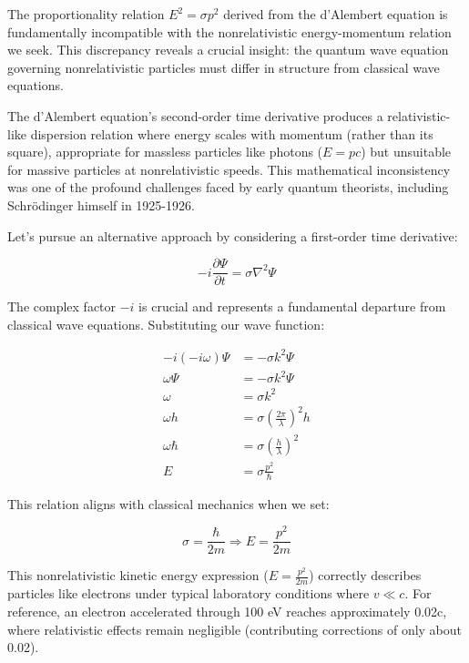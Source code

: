 \documentclass[italian]{HKNdocument}
\begin{document}
The proportionality relation $E^2 = \sigma p^2$ derived from the d'Alembert equation is fundamentally incompatible with the nonrelativistic energy-momentum relation we seek. This discrepancy reveals a crucial insight: the quantum wave equation governing nonrelativistic particles must differ in structure from classical wave equations.

The d'Alembert equation's second-order time derivative produces a relativistic-like dispersion relation where energy scales with momentum (rather than its square), appropriate for massless particles like photons ($E = pc$) but unsuitable for massive particles at nonrelativistic speeds. This mathematical inconsistency was one of the profound challenges faced by early quantum theorists, including Schrödinger himself in 1925-1926.

Let's pursue an alternative approach by considering a first-order time derivative:

\begin{equation}
-i \frac{\partial \Psi}{\partial t}=\sigma \nabla^{2} \Psi \label{eq:1.4}
\end{equation}

The complex factor $-i$ is crucial and represents a fundamental departure from classical wave equations. Substituting our wave function:

\begin{align}
-i(-i\omega) \Psi & =-\sigma k^{2} \Psi \\
\omega \Psi & =-\sigma k^{2} \Psi \\
\omega & =\sigma k^{2} \\
\omega h & =\sigma\left(\frac{2 \pi}{\lambda}\right)^{2} h  \\
\omega \hbar & =\sigma\left(\frac{h}{\lambda}\right)^{2} \\
E & =\sigma \frac{p^{2}}{\hbar}
\end{align}

This relation aligns with classical mechanics when we set:

\begin{equation}
\sigma=\frac{\hbar}{2 m} \Rightarrow E=\frac{p^{2}}{2 m}
\end{equation}

This nonrelativistic kinetic energy expression ($E=\frac{p^2}{2m}$) correctly describes particles like electrons under typical laboratory conditions where $v \ll c$. For reference, an electron accelerated through 100 eV reaches approximately 0.02c, where relativistic effects remain negligible (contributing corrections of only about 0.02).
\end{document}
